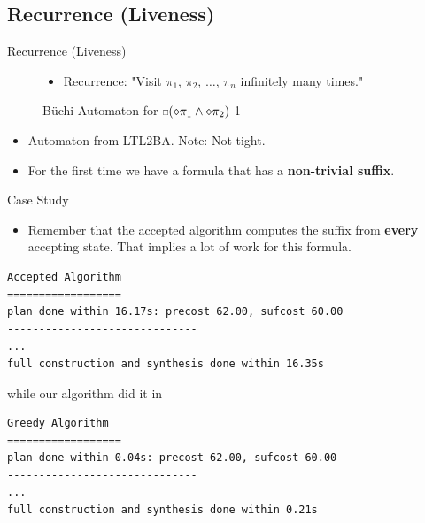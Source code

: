 \documentclass{beamer}
\newcommand{\ssquare}{\text{\scalebox{0.6}{$\square$}}}
\begin{document}
\subsection{Recurrence (Liveness)}
\begin{frame}{Recurrence (Liveness)}
\begin{figure}
\centering
\begin{itemize}
\item Recurrence: "Visit $\pi_1$, $\pi_2$, $\dots$, $\pi_n$ infinitely many times."
\end{itemize}
\caption{B\"uchi Automaton for $\ssquare(\diamond \pi_1 \land \diamond \pi_2 )$ 1}
\label{fig:gasBuchiRec}
\end{figure}
\begin{itemize}
\item \small Automaton from LTL2BA. Note: Not tight.
\pause
\item For the first time we have a formula that has a \textbf{non-trivial suffix}.
\end{itemize}
\end{frame}

\begin{frame}[fragile]{Case Study}
\begin{itemize}
\item Remember that the accepted algorithm computes the suffix from \textbf{every} accepting state. That implies a lot of work for this formula.
\end{itemize}
\pause
\begingroup
\fontsize{9pt}{12pt}\selectfont
\begin{lstlisting}
Accepted Algorithm
==================
plan done within 16.17s: precost 62.00, sufcost 60.00
------------------------------
...
full construction and synthesis done within 16.35s 
\end{lstlisting}
\endgroup
while our algorithm did it in
\begingroup
\fontsize{9pt}{12pt}\selectfont
\begin{lstlisting}
Greedy Algorithm
==================
plan done within 0.04s: precost 62.00, sufcost 60.00
------------------------------
...
full construction and synthesis done within 0.21s 
\end{lstlisting}
\endgroup
\end{frame}
\end{document}
